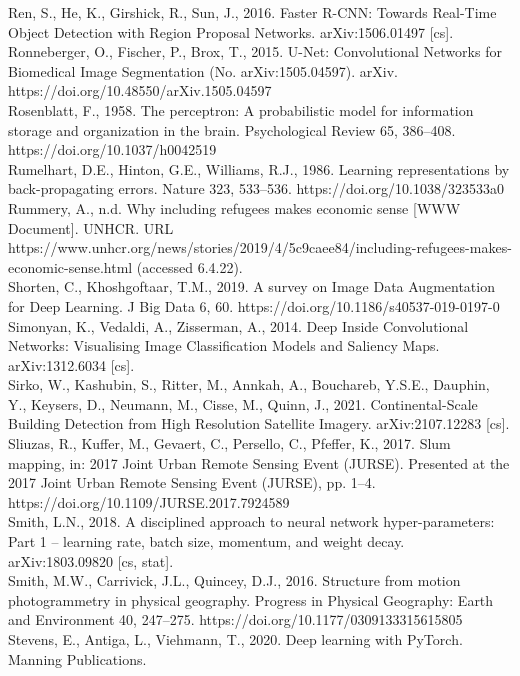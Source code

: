 \documentclass[11pt, a4paper, twoside]{report}
\begin{document}
Ren, S., He, K., Girshick, R., Sun, J., 2016. Faster R-CNN: Towards Real-Time Object Detection with Region Proposal Networks. arXiv:1506.01497 [cs].\\
Ronneberger, O., Fischer, P., Brox, T., 2015. U-Net: Convolutional Networks for Biomedical Image Segmentation (No. arXiv:1505.04597). arXiv. https://doi.org/10.48550/arXiv.1505.04597\\
Rosenblatt, F., 1958. The perceptron: A probabilistic model for information storage and organization in the brain. Psychological Review 65, 386–408. https://doi.org/10.1037/h0042519\\
Rumelhart, D.E., Hinton, G.E., Williams, R.J., 1986. Learning representations by back-propagating errors. Nature 323, 533–536. https://doi.org/10.1038/323533a0\\
Rummery, A., n.d. Why including refugees makes economic sense [WWW Document]. UNHCR. URL https://www.unhcr.org/news/stories/2019/4/5c9caee84/including-refugees-makes-economic-sense.html (accessed 6.4.22).\\
Shorten, C., Khoshgoftaar, T.M., 2019. A survey on Image Data Augmentation for Deep Learning. J Big Data 6, 60. https://doi.org/10.1186/s40537-019-0197-0\\
Simonyan, K., Vedaldi, A., Zisserman, A., 2014. Deep Inside Convolutional Networks: Visualising Image Classification Models and Saliency Maps. arXiv:1312.6034 [cs].\\
Sirko, W., Kashubin, S., Ritter, M., Annkah, A., Bouchareb, Y.S.E., Dauphin, Y., Keysers, D., Neumann, M., Cisse, M., Quinn, J., 2021. Continental-Scale Building Detection from High Resolution Satellite Imagery. arXiv:2107.12283 [cs].\\
Sliuzas, R., Kuffer, M., Gevaert, C., Persello, C., Pfeffer, K., 2017. Slum mapping, in: 2017 Joint Urban Remote Sensing Event (JURSE). Presented at the 2017 Joint Urban Remote Sensing Event (JURSE), pp. 1–4. https://doi.org/10.1109/JURSE.2017.7924589\\
Smith, L.N., 2018. A disciplined approach to neural network hyper-parameters: Part 1 -- learning rate, batch size, momentum, and weight decay. arXiv:1803.09820 [cs, stat].\\
Smith, M.W., Carrivick, J.L., Quincey, D.J., 2016. Structure from motion photogrammetry in physical geography. Progress in Physical Geography: Earth and Environment 40, 247–275. https://doi.org/10.1177/0309133315615805\\
Stevens, E., Antiga, L., Viehmann, T., 2020. Deep learning with PyTorch. Manning Publications.\\
\end{document}
